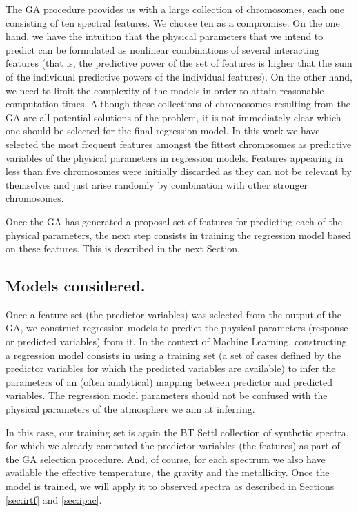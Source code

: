 The GA procedure provides us with a large collection of chromosomes,
each one consisting of ten spectral features. We choose ten as a
compromise. On the one hand, we have the intuition that the physical
parameters that we intend to predict can be formulated as nonlinear
combinations of several interacting features (that is, the predictive
power of the set of features is higher that the sum of the individual
predictive powers of the individual features). On the other hand, we
need to limit the complexity of the models in order to attain
reasonable computation times. Although these collections of
chromosomes resulting from the GA are all potential solutions of the
problem, it is not immediately clear which one should be selected for
the final regression model. In this work we have selected the most
frequent features amongst the fittest chromosomes as predictive
variables of the physical parameters in regression models. Features
appearing in less than five chromosomes were initially discarded as
they can not be relevant by themselves and just arise randomly by
combination with other stronger chromosomes.

Once the GA has generated a proposal set of features for predicting
each of the physical parameters, the next step consists in training
the regression model based on these features. This is described in the
next Section.

\subsection{Models considered.}
\label {ssub:models}

Once a feature set (the predictor variables) was selected from the
output of the GA, we construct regression models to predict the
physical parameters (response or predicted variables) from it. In the
context of Machine Learning, constructing a regression model consists
in using a training set (a set of cases defined by the predictor
variables for which the predicted variables are available) to infer
the parameters of an (often analytical) mapping between predictor and
predicted variables. The regression model parameters should not be
confused with the physical parameters of the atmosphere we aim at
inferring. 

In this case, our training set is again the BT Settl collection of
synthetic spectra, for which we already computed the predictor
variables (the features) as part of the GA selection procedure. And,
of course, for each spectrum we also have available the effective
temperature, the gravity and the metallicity. Once the model is
trained, we will apply it to observed spectra as described in
Sections \ref{sec:irtf} and \ref{sec:ipac}.  

